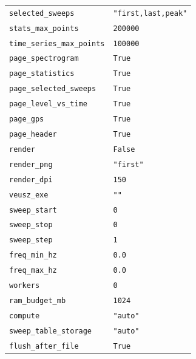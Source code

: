 \documentclass[11pt,a4paper]{article}
\begin{document}
\begin{longtable}{p{5.6cm}p{9.6cm}}
\texttt{selected\_\allowbreak{}sweeps} & \texttt{"first,last,peak"}\\
\texttt{stats\_\allowbreak{}max\_\allowbreak{}points} & \texttt{200000}\\
\texttt{time\_\allowbreak{}series\_\allowbreak{}max\_\allowbreak{}points} & \texttt{100000}\\
\texttt{page\_\allowbreak{}spectrogram} & \texttt{True}\\
\texttt{page\_\allowbreak{}statistics} & \texttt{True}\\
\texttt{page\_\allowbreak{}selected\_\allowbreak{}sweeps} & \texttt{True}\\
\texttt{page\_\allowbreak{}level\_\allowbreak{}vs\_\allowbreak{}time} & \texttt{True}\\
\texttt{page\_\allowbreak{}gps} & \texttt{True}\\
\texttt{page\_\allowbreak{}header} & \texttt{True}\\
\texttt{render} & \texttt{False}\\
\texttt{render\_\allowbreak{}png} & \texttt{"first"}\\
\texttt{render\_\allowbreak{}dpi} & \texttt{150}\\
\texttt{veusz\_\allowbreak{}exe} & \texttt{""}\\
\texttt{sweep\_\allowbreak{}start} & \texttt{0}\\
\texttt{sweep\_\allowbreak{}stop} & \texttt{0}\\
\texttt{sweep\_\allowbreak{}step} & \texttt{1}\\
\texttt{freq\_\allowbreak{}min\_\allowbreak{}hz} & \texttt{0.0}\\
\texttt{freq\_\allowbreak{}max\_\allowbreak{}hz} & \texttt{0.0}\\
\texttt{workers} & \texttt{0}\\
\texttt{ram\_\allowbreak{}budget\_\allowbreak{}mb} & \texttt{1024}\\
\texttt{compute} & \texttt{"auto"}\\
\texttt{sweep\_\allowbreak{}table\_\allowbreak{}storage} & \texttt{"auto"}\\
\texttt{flush\_\allowbreak{}after\_\allowbreak{}file} & \texttt{True}\\
\bottomrule
\end{longtable}
\end{document}

